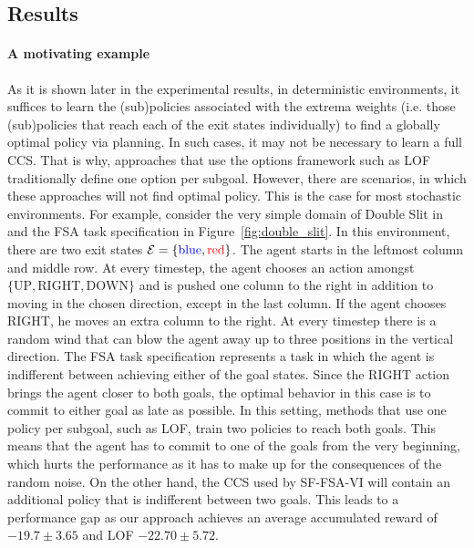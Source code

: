 \subsection{Results}
\paragraph{A motivating example} As it is shown later in the experimental results, in deterministic environments, it suffices to learn the (sub)policies associated with the extrema weights (i.e. those (sub)policies that reach each of the exit states individually) to find a globally optimal policy via planning. In such cases, it may not be necessary to learn a full CCS. That is why, approaches that use the options framework such as LOF traditionally define one option per subgoal. However, there are scenarios, in which these approaches will not find optimal policy. This is the case for most stochastic environments. For example, consider the very simple domain of Double Slit in and the FSA task specification in Figure~\ref{fig:double_slit}. In this environment, there are two exit states $\mathcal{E}=\{{\color{blue} \text{blue}}, {\color{red}\text{red}}\}$. The agent starts in the leftmost column and middle row. At every timestep, the agent chooses an action amongst $\{\text{UP}, \text{RIGHT}, \text{DOWN}\}$ and is pushed one column to the right in addition to moving in the chosen direction, except in the last column. If the agent chooses RIGHT, he moves an extra column to the right. At every timestep there is a random wind that can blow the agent away up to three positions in the vertical direction. The FSA task specification represents a task in which the agent is indifferent between achieving either of the goal states. Since the RIGHT action brings the agent closer to both goals, the optimal behavior in this case is to commit to either goal as late as possible. In this setting, methods that use one policy per subgoal, such as LOF, train two policies to reach both goals. This means that the agent has to commit to one of the goals from the very beginning, which hurts the performance as it has to make up for the consequences of the random noise. On the other hand, the CCS used by SF-FSA-VI will contain an additional policy that is indifferent between two goals. This leads to a performance gap as our approach achieves an average accumulated reward of $-19.7\pm3.65$ and LOF $-22.70\pm 5.72$.

